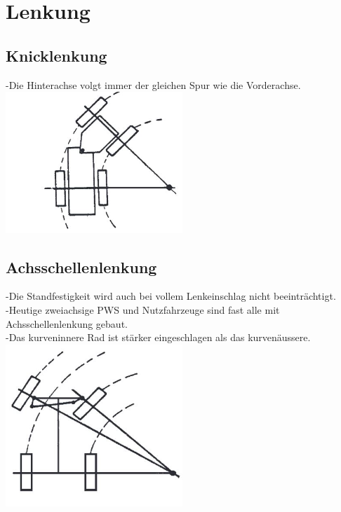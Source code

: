 \section{Lenkung}
\subsection{Knicklenkung}
-Die Hinterachse volgt immer der gleichen Spur wie die Vorderachse.\\
\includegraphics[width=0.5\textwidth]{Images/Knicklenkung.JPG}
\subsection{Achsschellenlenkung}
-Die Standfestigkeit wird auch bei vollem Lenkeinschlag nicht beeinträchtigt.\\
-Heutige zweiachsige PWS und Nutzfahrzeuge sind fast alle mit Achsschellenlenkung gebaut.\\
-Das kurveninnere Rad ist stärker eingeschlagen als das kurvenäussere.\\
\includegraphics[width=0.5\textwidth]{Images/Achsschellenlenkung.JPG}
